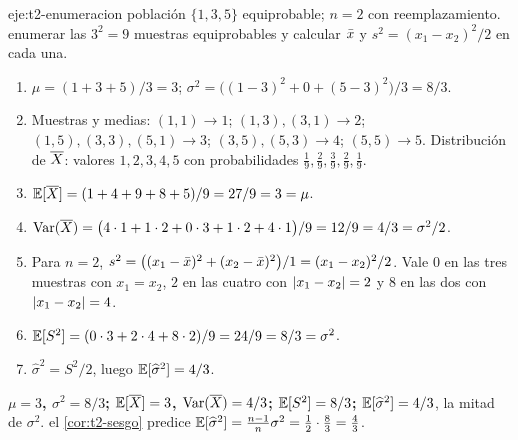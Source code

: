 \begin{solucion}{eje:t2-enumeracion}
\datos población $\{1,3,5\}$ equiprobable; $n=2$ con reemplazamiento.
\planteamiento enumerar las $3^{2}=9$ muestras equiprobables y calcular $\bar{x}$ y $s^{2}=(x_1-x_2)^{2}/2$ en cada una.
\pasos
\begin{enumerate}[label=\arabic*.]
  \item $\mu=(1+3+5)/3=3$; $\sigma^{2}=\bigl((1-3)^{2}+0+(5-3)^{2}\bigr)/3=8/3$.
  \item Muestras y medias: $(1,1)\to1$; $(1,3),(3,1)\to2$; $(1,5),(3,3),(5,1)\to3$; $(3,5),(5,3)\to4$; $(5,5)\to5$. Distribución de $\overline{X}$: valores $1,2,3,4,5$ con probabilidades $\frac19,\frac29,\frac39,\frac29,\frac19$.
  \item $\mathbb{E}[\overline{X}]=(1+4+9+8+5)/9=27/9=3=\mu$.
  \item $\operatorname{Var}(\overline{X})=\bigl(4\cdot1+1\cdot2+0\cdot3+1\cdot2+4\cdot1\bigr)/9=12/9=4/3=\sigma^{2}/2$.
  \item Para $n=2$, $s^{2}=\bigl((x_1-\bar{x})^{2}+(x_2-\bar{x})^{2}\bigr)/1=(x_1-x_2)^{2}/2$. Vale $0$ en las tres muestras con $x_1=x_2$, $2$ en las cuatro con $\lvert x_1-x_2\rvert=2$ y $8$ en las dos con $\lvert x_1-x_2\rvert=4$.
  \item $\mathbb{E}[S^{2}]=(0\cdot3+2\cdot4+8\cdot2)/9=24/9=8/3=\sigma^{2}$.
  \item $\widehat\sigma^{2}=S^{2}/2$, luego $\mathbb{E}[\widehat\sigma^{2}]=4/3$.
\end{enumerate}
\resultado \textbf{$\mu=3$, $\sigma^{2}=8/3$; $\mathbb{E}[\overline{X}]=3$, $\operatorname{Var}(\overline{X})=4/3$; $\mathbb{E}[S^{2}]=8/3$; $\mathbb{E}[\widehat\sigma^{2}]=4/3$}, la mitad de $\sigma^{2}$.
\comprobacion el \cref{cor:t2-sesgo} predice $\mathbb{E}[\widehat\sigma^{2}]=\frac{n-1}{n}\sigma^{2}=\frac12\cdot\frac83=\frac43$.
\end{solucion}

